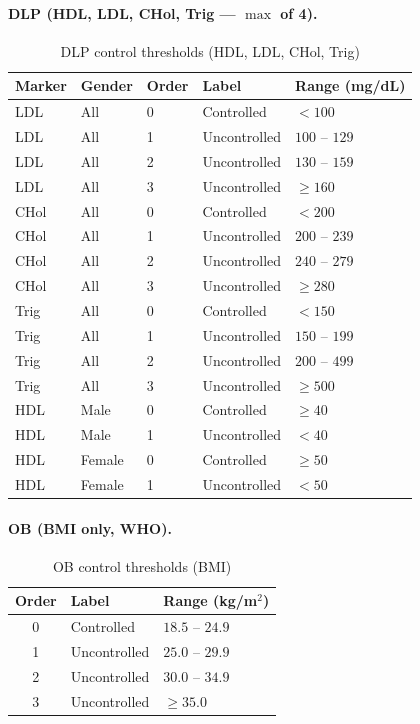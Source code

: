 \documentclass[11pt,a4paper]{article}
\begin{document}
\paragraph{DLP (HDL, LDL, CHol, Trig --- $\max$ of 4).}

\begin{table}[ht]
\centering
\caption{DLP control thresholds (HDL, LDL, CHol, Trig)}
\begin{tabular}{@{}lllll@{}}
\toprule
\textbf{Marker} & \textbf{Gender} & \textbf{Order} & \textbf{Label} & \textbf{Range (mg/dL)} \\
\midrule
LDL  & All   & 0 & Controlled      & $< 100$ \\
LDL  & All   & 1 & Uncontrolled    & $100$ -- $129$ \\
LDL  & All   & 2 & Uncontrolled    & $130$ -- $159$ \\
LDL  & All   & 3 & Uncontrolled    & $\geq 160$ \\
\midrule
CHol & All   & 0 & Controlled      & $< 200$ \\
CHol & All   & 1 & Uncontrolled    & $200$ -- $239$ \\
CHol & All   & 2 & Uncontrolled    & $240$ -- $279$ \\
CHol & All   & 3 & Uncontrolled    & $\geq 280$ \\
\midrule
Trig & All   & 0 & Controlled      & $< 150$ \\
Trig & All   & 1 & Uncontrolled    & $150$ -- $199$ \\
Trig & All   & 2 & Uncontrolled    & $200$ -- $499$ \\
Trig & All   & 3 & Uncontrolled    & $\geq 500$ \\
\midrule
HDL  & Male  & 0 & Controlled      & $\geq 40$ \\
HDL  & Male  & 1 & Uncontrolled    & $< 40$ \\
HDL  & Female & 0 & Controlled     & $\geq 50$ \\
HDL  & Female & 1 & Uncontrolled   & $< 50$ \\
\bottomrule
\end{tabular}
\end{table}

\paragraph{OB (BMI only, WHO).}

\begin{table}[ht]
\centering
\caption{OB control thresholds (BMI)}
\begin{tabular}{@{}cll@{}}
\toprule
\textbf{Order} & \textbf{Label} & \textbf{Range (kg/m$^2$)} \\
\midrule
0 & Controlled      & $18.5$ -- $24.9$ \\
1 & Uncontrolled    & $25.0$ -- $29.9$ \\
2 & Uncontrolled    & $30.0$ -- $34.9$ \\
3 & Uncontrolled    & $\geq 35.0$ \\
\bottomrule
\end{tabular}
\end{table}
\end{document}
